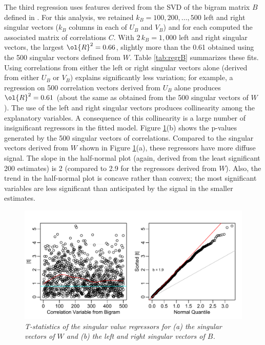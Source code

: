 \documentclass[12pt]{article}
\begin{document}
 The third regression uses features derived from the SVD of the bigram matrix
 $B$ defined in .  For this analysis, we retained $k_B=100, 200, \ldots, 500$ left and right singular vectors ($k_B$ columns in each of $U_B$ and $V_B$) and for each computed the associated matrix of correlations $C$.  With $2 \, k_B = 1,000$ left and right singular vectors, the largest $\ol{R}^2 = 0.66$, slightly more than the 0.61 obtained using the 500 singular vectors defined from $W$.  Table \ref{tab:regrB} summarizes these fits.  Using correlations from either the left or right singular vectors alone (derived from either $U_B$ or $V_B$) explains significantly less variation; for example, a regression on 500 correlation vectors derived from  $U_B$ alone  produces $\ol{R}^2 = 0.61$ (about the same as obtained from the 500 singular vectors of $W$). The use of the left and right singular vectors produces collinearity among the explanatory variables.  A consequence of this collinearity is a large number of insignificant regressors in the fitted model.  Figure \ref{fig:svdregr}(b) shows the p-values generated by the 500 singular vectors of correlations.  Compared to the singular vectors derived from $W$ shown in Figure \ref{fig:svdregr}(a), these regressors have more diffuse signal.  The slope in the half-normal plot (again, derived from the least significant 200 estimates) is 2 (compared to 2.9 for the regressors derived from $W$).  Also, the trend in the half-normal plot is concave rather than convex; the most significant variables are less significant than anticipated by the signal in the smaller estimates.

 \begin{figure}
 \caption{ \label{fig:svdregr} { \sl T-statistics of the singular value regressors
 for (a) the singular vectors of $W$ and (b) the left and right singular vectors
 of $B$.}}
 \vspace{0.1in}
 \centerline{  \includegraphics[width=6in]{figures/regrB}  }
 \end{figure}
\end{document}
